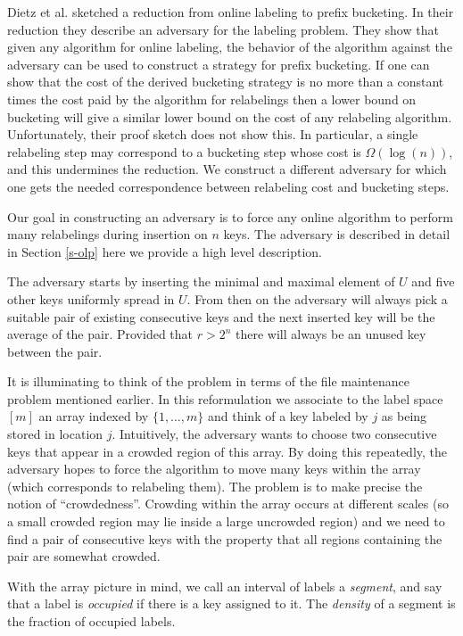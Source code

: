 \documentclass[runningheads,a4paper]{llncs}
\begin{document}
Dietz et al. \cite{DSZ04} sketched a reduction from online labeling to prefix bucketing.  In their reduction they describe an adversary
for the labeling problem.  They show that given any algorithm for online labeling, the behavior of the algorithm
against the adversary can be used to construct a strategy for prefix bucketing.  If one can show that the cost of the derived bucketing strategy
is no more than a constant times  the cost paid by the algorithm for relabelings then a lower bound on bucketing
will give a similar lower bound on the cost of any relabeling algorithm.  Unfortunately, their proof sketch does not show this.
In particular, a single relabeling step may correspond to a bucketing step whose cost is $\Omega(\log(n))$, and this
undermines the reduction.  We construct a different adversary for which one gets the needed correspondence
between relabeling cost and bucketing steps.

Our goal in constructing an adversary is to force any online algorithm to perform many relabelings during insertion on $n$ keys. 
The adversary is described
in detail in Section \ref{s-olp} here we provide a high level description.

The adversary starts by inserting the minimal and maximal element of $U$ and five other keys uniformly spread in $U$.
From then on the adversary will always pick a suitable pair of existing consecutive keys and the next inserted key
will be the average of the pair. Provided that $r>2^n$ there will always be an unused key between the pair.


It is illuminating to think of the problem in terms of the file maintenance problem
mentioned earlier.  In this reformulation we associate to the label space $[m]$ an array indexed by $\{1,\ldots,m\}$ and think of
a key labeled by $j$ as being stored in location $j$. Intuitively, 
the adversary wants to choose two consecutive keys that appear in a crowded region of this array.  By doing this repeatedly,
the adversary hopes to force
the algorithm to move many keys within the array (which corresponds to relabeling them). 
The problem is to make precise the notion of ``crowdedness''.  Crowding within the array occurs at different scales (so a small crowded region may lie inside
a large uncrowded region)  and we need to find a pair of consecutive keys with the property that all regions containing the pair are
somewhat crowded.

With the array picture in mind,
we  call an interval of labels a \emph{segment}, and say that a label is {\em occupied} if there is a key assigned to it. 
The \emph{density} of a segment is the fraction of occupied labels.   
\end{document}
